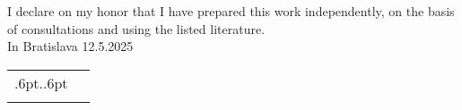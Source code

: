 \thispagestyle{empty}

\newcommand{\signaturespace}[2]{
  \begingroup
  \renewcommand{\arraystretch}{0}
  \begin{tabular}[t]{cc}
  \hspace*{0pt}
  \cleaders\hbox{\kern.6pt.\kern.6pt}\hskip#1\relax
  \hspace*{0pt}
  \\[0.5cm]
  #2
  \end{tabular}
  \endgroup
}

\vspace*{\fill}


I declare on my honor that I have prepared this work independently, on the basis of consultations and using the listed literature. \\

In Bratislava 12.5.2025
\hspace*{\fill} \signaturespace{5cm}{\myName}


\clearpage